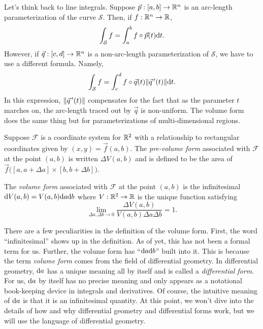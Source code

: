 Let's think back to line integrals.  Suppose $\vec p:[a,b]\to\mathbb{R}^n$ is an
arc-length parameterization
of the curve $\mathcal S$. Then, if $f:\mathbb{R}^n\to\mathbb{R}$,
\[
	\int_{\mathcal S} f = \int_{a}^b f\circ \vec p(t) \mathrm{d} t.
\]
However, if $\vec q:[c,d]\to\mathbb{R}^n$ is a non-arc-length parameterization of $\mathcal S$, we have to
use a different formula.  Namely,
\[
	\int_{\mathcal S} f = \int_{c}^d f\circ \vec q(t)\lVert\vec q\,'(t)\rVert \mathrm{d} t.
\]
In this expression, $\lVert\vec q\,'(t)\rVert$ compensates for the fact that as the parameter
$t$ marches on, the arc-length traced out by $\vec q$ is non-uniform.  The volume form does
the same thing but for parameterizations of multi-dimensional regions.


\begin{definition}
	Suppose $\mathcal F$ is a coordinate system for $\mathbb{R}^2$ with a relationship
	to rectangular coordinates given by $(x,y)=\vec f(a,b)$.
	The \emph{pre-volume form} associated with $\mathcal F$ at the point $(a,b)$
	is written $\Delta V(a,b)$ and is defined to be the area of
	$\vec f\big([a,a+\Delta a]\times [b,b+\Delta b]\big)$.
	
	The \emph{volume form} associated with $\mathcal F$ at the point $(a,b)$
	is the infinitesimal $\mathrm{d} V(a,b)=V(a,b)\mathrm{d} a\mathrm{d} b$ where $V:\mathbb{R}^2\to\mathbb{R}$ is the 
	unique function satisfying
	\[
		\lim_{\Delta a,\Delta b\to 0} \frac{\Delta V(a,b)}{V(a,b)\Delta a\Delta b}=1.
	\]
\end{definition}

There are a few peculiarities in the definition of the volume form.
First, the word ``infinitesimal'' shows up in the definition.  As of yet,
this has not been a formal term for us.  Further, the volume form has
``$\mathrm{d} a\mathrm{d} b$'' built into it.  This is because the term \emph{volume form}
comes from the field of differential geometry.  In differential geometry,
$\mathrm{d} a$ has a unique meaning all by itself and is called a \emph{differential form}.  For
us, $\mathrm{d} a$  by itself has no precise
meaning and only appears as a notational book-keeping device in integrals and derivatives.
Of course, the intuitive meaning of $\mathrm{d} a$ is that it is an infinitesimal quantity.
At this point, we won't dive into the details of how and why differential geometry and differential forms
work, but we
will use the language of differential geometry.

